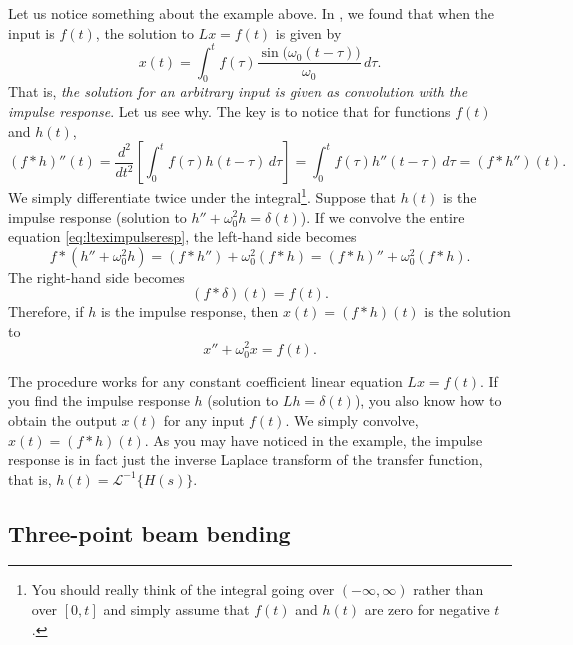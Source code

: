 Let us notice something about the example above. 
In ,
we found that
when the input is $f(t)$, the solution to $Lx = f(t)$
is given by
\begin{equation*}
x(t) = 
\int_0^t
f(\tau) 
\frac{\sin \bigl( \omega_0 (t-\tau) \bigr)}{\omega_0} \, d\tau .
\end{equation*}
That is, \emph{the solution for an arbitrary input is given as
convolution with the impulse response}.  Let us see why.
The key is to notice that for functions $f(t)$ and $h(t)$,
\begin{equation*}
(f * h)''(t) =
\frac{d^2}{dt^2}\left[
\int_0^t
f(\tau) 
h(t-\tau) \, d\tau \right]
=
\int_0^t
f(\tau) 
h''(t-\tau) \, d\tau
= (f * h'')(t) .
\end{equation*}
We simply differentiate twice under the
integral\footnote{You should really think of the integral going over
$(-\infty,\infty)$ rather than over $[0,t]$ and simply assume that $f(t)$ and
$h(t)$ are zero for negative $t$.}.
Suppose that $h(t)$ is the impulse response (solution to $h''+\omega_0^2 h = \delta(t)$).
If we convolve the entire equation \eqref{eq:lteximpulseresp},
the left-hand side becomes
\begin{equation*}
f * (h'' + \omega_0^2 h) =
(f * h'') + \omega_0^2 (f * h) =
(f * h)'' + \omega_0^2 (f * h) .
\end{equation*}
The right-hand side becomes
\begin{equation*}
(f * \delta)(t) = f(t).
\end{equation*}
Therefore, if $h$ is the impulse response,
then $x(t) = (f * h)(t)$ is the solution to
\begin{equation*}
x'' + \omega_0^2 x = f(t) .
\end{equation*}

The procedure works for any constant coefficient linear
equation $Lx = f(t)$.
If you find the impulse response $h$
(solution to $Lh = \delta(t)$),
you also know how to obtain the output $x(t)$ for any input $f(t)$.
We simply convolve, $x(t) = (f * h)(t)$.
As you may have noticed in the example,
the impulse response is in fact just the inverse Laplace
transform of the transfer function, that is,
$h(t) = {\mathcal{L}}^{-1} \bigl\{ H(s) \bigr\}$.

\subsection{Three-point beam bending}

